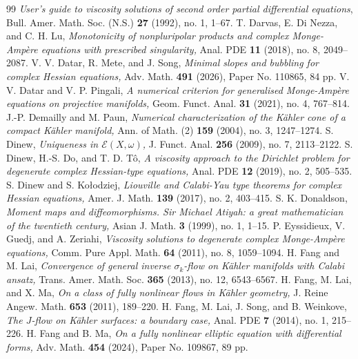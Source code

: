 \documentclass{amsart}
\numberwithin{equation}{section}
\theoremstyle{plain}
\theoremstyle{definition}
\theoremstyle{remark}
\begin{document}
\begin{thebibliography}{99}
  \textit{User's guide to viscosity solutions of second order partial differential equations}, 
  Bull. Amer. Math. Soc. (N.S.) \textbf{27} (1992), no. 1, 1--67.
  T. Darvas, E. Di Nezza, and C. H. Lu, 
  \textit{Monotonicity of nonpluripolar products and complex Monge-Ampère equations with prescribed singularity,} 
  Anal. PDE \textbf{11} (2018), no. 8, 2049--2087. 
  V. V. Datar, R. Mete, and J. Song,
  \textit{Minimal slopes and bubbling for complex Hessian equations,}
  Adv. Math. \textbf{491} (2026), Paper No. 110865, 84 pp.
  V. V. Datar and V. P. Pingali, 
  \textit{A numerical criterion for generalised Monge-Ampère equations on projective manifolds,}
  Geom. Funct. Anal. \textbf{31} (2021), no. 4, 767--814.
  J.-P. Demailly and M. Paun, 
  \textit{Numerical characterization of the K{\"a}hler cone of a compact K{\"a}hler manifold,} 
  Ann. of Math. (2) \textbf{159} (2004), no. 3, 1247--1274. 
  S. Dinew, 
  \textit{Uniqueness in $\mathscr E(X,\omega)$,} 
  J. Funct. Anal. \textbf{256} (2009), no. 7, 2113--2122. 
  S. Dinew, H.-S. Do, and T. D. T{\^o}, 
  \textit{A viscosity approach to the Dirichlet problem for degenerate complex Hessian-type equations,}
  Anal. PDE \textbf{12} (2019), no. 2, 505--535.
  S. Dinew and S. Kołodziej, 
  \textit{Liouville and Calabi-Yau type theorems for complex Hessian equations,} 
  Amer. J. Math. \textbf{139} (2017), no. 2, 403--415. 
  S. K. Donaldson, 
  \textit{Moment maps and diffeomorphisms. Sir Michael Atiyah: a great mathematician of the twentieth century,} 
  Asian J. Math. \textbf{3} (1999), no. 1, 1--15.  
  P. Eyssidieux, V. Guedj, and A. Zeriahi, 
  \textit{Viscosity solutions to degenerate complex Monge-Amp{\`e}re equations,} 
  Comm. Pure Appl. Math. \textbf{64} (2011), no. 8, 1059--1094. 
  H. Fang and M. Lai, 
  \textit{Convergence of general inverse $\sigma_k$-flow on Kähler manifolds with Calabi ansatz,}
  Trans. Amer. Math. Soc. \textbf{365} (2013), no. 12, 6543--6567.
  H. Fang, M. Lai, and X. Ma, 
  \textit{On a class of fully nonlinear flows in K{\"a}hler geometry,} 
  J. Reine Angew. Math. \textbf{653} (2011), 189--220.
  H. Fang, M. Lai, J. Song, and B. Weinkove,
  \textit{The $J$-flow on Kähler surfaces: a boundary case,}
  Anal. PDE \textbf{7} (2014), no. 1, 215--226.
  H. Fang and B. Ma, 
  \textit{On a fully nonlinear elliptic equation with differential forms,} Adv. Math. {\bf 454} (2024), Paper No. 109867, 89 pp.

\end{thebibliography}
\end{document}
